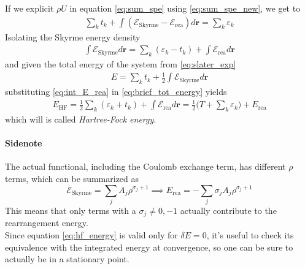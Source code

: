 If we explicit $\rho U$ in equation \eqref{eq:sum_spe} using \eqref{eq:sum_spe_new}, we get to
\begin{align*}
    \sum_k t_k + \int (\mathcal E_\text{Skyrme}-\mathcal E_\text{rea}) d\bm r = \sum_k \varepsilon_k 
\end{align*}
Isolating the Skyrme energy density
\begin{align}
    \label{eq:int_E_rea}
    \int \mathcal E_\text{Skyrme} d\bm r = \sum_k (\varepsilon_k -t_k) + \int \mathcal E_\text{rea} d\bm r
\end{align}
and given the total energy of the system from \eqref{eq:slater_exp}
\begin{align}
    \label{eq:brief_tot_energy}
E=\sum_k t_k + \frac 1 2 \int \mathcal E_\text{Skyrme} d\bm r 
\end{align}
substituting \eqref{eq:int_E_rea} in \eqref{eq:brief_tot_energy} yields
\begin{align}
    \label{eq:hf_energy}
E_\text{HF} = \frac 1 2 \sum_k (\varepsilon_k + t_k) +\int \mathcal E_\text{rea} d\bm r = \frac 1 2 \bigg(T+\sum_k\varepsilon_k\bigg) +E_\text{rea}
\end{align}
which will is called \textit{Hartree-Fock energy}.
\paragraph{Sidenote}
The actual functional, including the Coulomb exchange term, has different $\rho$ terms, which can be summarized as
\begin{equation*}
    \mathcal E_\text{Skyrme} = \sum_j A_j \rho^{\sigma_j+1} \implies E_\text{rea} = -\sum_j \sigma_j A_j \rho^{\sigma_j+1} 
\end{equation*}
This means that only terms with a $\sigma_j\neq 0, -1$ actually contribute to the rearrangement energy.
\\Since equation \eqref{eq:hf_energy} is valid only for $\delta E = 0$, it's useful to check its equivalence with the integrated energy at convergence, so one can be sure to actually be in a stationary point.